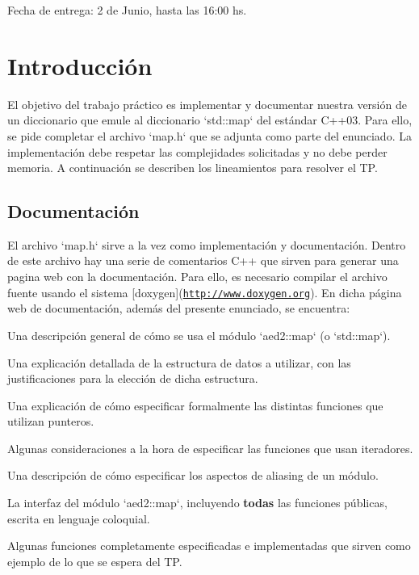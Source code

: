 
\begin{DoxyItemize}
\item \-Fecha de entrega\-: 2 de \-Junio, hasta las 16\-:00 hs.
\end{DoxyItemize}\hypertarget{Enunciado_intro-enunciado}{}\section{\-Introducción}\label{Enunciado_intro-enunciado}
\-El objetivo del trabajo práctico es implementar y documentar nuestra versión de un diccionario que emule al diccionario `std\-::map` del estándar \-C++03. \-Para ello, se pide completar el archivo `map.h` que se adjunta como parte del enunciado. \-La implementación debe respetar las complejidades solicitadas y no debe perder memoria. \-A continuación se describen los lineamientos para resolver el \-T\-P.\hypertarget{Enunciado_intro-doc}{}\subsection{\-Documentación}\label{Enunciado_intro-doc}
\-El archivo `map.h` sirve a la vez como implementación y documentación. \-Dentro de este archivo hay una serie de comentarios \-C++ que sirven para generar una pagina web con la documentación. \-Para ello, es necesario compilar el archivo fuente usando el sistema \mbox{[}doxygen\mbox{]}(\href{http://www.doxygen.org}{\tt http\-://www.\-doxygen.\-org}). \-En dicha página web de documentación, además del presente enunciado, se encuentra\-:


\begin{DoxyItemize}
\item \-Una descripción general de cómo se usa el módulo `aed2\-::map` (o `std\-::map`).
\item \-Una explicación detallada de la estructura de datos a utilizar, con las justificaciones para la elección de dicha estructura.
\item \-Una explicación de cómo especificar formalmente las distintas funciones que utilizan punteros.
\item \-Algunas consideraciones a la hora de especificar las funciones que usan iteradores.
\item \-Una descripción de cómo especificar los aspectos de aliasing de un módulo.
\item \-La interfaz del módulo `aed2\-::map`, incluyendo {\bfseries todas} las funciones públicas, escrita en lenguaje coloquial.
\item \-Algunas funciones completamente especificadas e implementadas que sirven como ejemplo de lo que se espera del \-T\-P.
\end{DoxyItemize}

